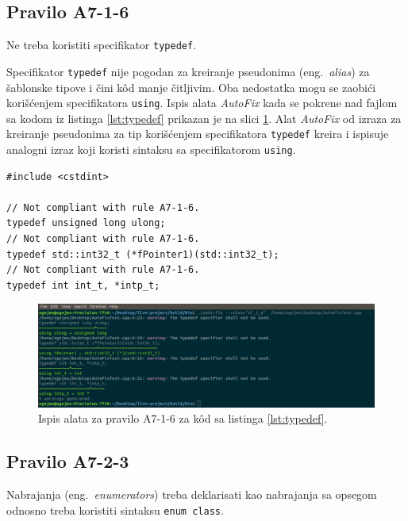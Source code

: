\documentclass[12pt,oneside]{memoir}
\begin{document}
\subsection{Pravilo A7-1-6}
\begin{center}
\begin{tcolorbox}
Ne treba koristiti specifikator \texttt{typedef}. 
\end{tcolorbox}
\end{center}

Specifikator \texttt{typedef} nije pogodan za kreiranje pseudonima (eng.~\textit{alias}) za \v{s}ablonske tipove i \v{c}ini k\^{o}d manje \v{c}itljivim.
Oba nedostatka mogu se zaobi\'{c}i kori\v{s}\'{c}enjem specifikatora \texttt{using}.  Ispis alata \textit{AutoFix} kada se pokrene nad fajlom sa kodom iz listinga \ref{lst:typedef} prikazan je na slici \ref{fig:A7-1-6}. Alat \textit{AutoFix} od izraza za kreiranje pseudonima za tip kori\v{s}\'{c}enjem
specifikatora \texttt{typedef} kreira i ispisuje analogni izraz koji koristi sintaksu sa specifikatorom \texttt{using}.

\begin{lstlisting}[style=customc, caption={Primer koda koji nije napisan u skladu sa pravilom \textbf{A7-1-6}, odnosno koristi specifikator \texttt{typedef}.}, label=lst:typedef]
#include <cstdint>

// Not compliant with rule A7-1-6.
typedef unsigned long ulong;
// Not compliant with rule A7-1-6.
typedef std::int32_t (*fPointer1)(std::int32_t);
// Not compliant with rule A7-1-6.
typedef int int_t, *intp_t;

\end{lstlisting}

\begin{figure}[!h]
\begin{center}
\includegraphics[scale=0.3]{A7_1_6.png}
\end{center}
\caption{Ispis alata za pravilo A7-1-6 za k\^{o}d sa listinga \ref{lst:typedef}.}
\label{fig:A7-1-6}
\end{figure}


\subsection{Pravilo A7-2-3}
\begin{center}
\begin{tcolorbox}
Nabrajanja (eng.~\textit{enumerators}) treba deklarisati kao nabrajanja sa opsegom odnosno treba koristiti sintaksu \texttt{enum class}.
\end{tcolorbox}
\end{center}
\end{document}
